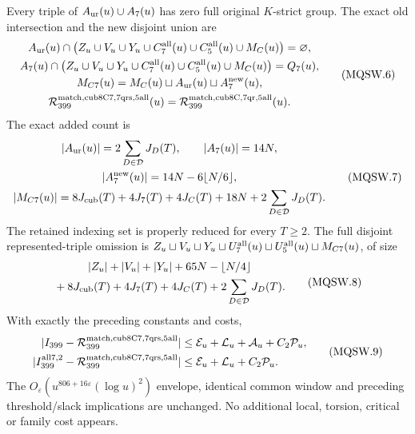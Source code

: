 \begin{theorem}
\label{AC-G218-window}
Every triple of
$A_{\rm ur}(u)\cup A_7(u)$ has zero full original $K$-strict group.
The exact old intersection and the new disjoint union are
\[
 \begin{gathered}
 A_{\rm ur}(u)\cap\bigl(Z_u\cup V_u\cup Y_u\cup C_7^{\rm all}(u)
                \cup C_5^{\rm all}(u)\cup M_C(u)\bigr)=\varnothing,\\
 A_7(u)\cap\bigl(Z_u\cup V_u\cup Y_u\cup C_7^{\rm all}(u)
                \cup C_5^{\rm all}(u)\cup M_C(u)\bigr)=Q_7(u),\\
 M_{C7}(u)=M_C(u)\sqcup A_{\rm ur}(u)\sqcup A_7^{\rm new}(u),\\
 \mathcal R_{399}^{\rm match,cub8C7,7qrs,5all}(u)
                      =\mathcal R_{399}^{\rm match,cub8C,7qr,5all}(u).
 \end{gathered}\tag{MQSW.6}
\]
The exact added count is
\[
 \begin{gathered}
 |A_{\rm ur}(u)|=2\sum_{D\in\mathcal D}J_D(T),\qquad
 |A_7(u)|=14N,\\
 |A_7^{\rm new}(u)|=14N-6\lfloor N/6\rfloor,\\
 |M_{C7}(u)|=8J_{\rm cub}(T)+4J_7(T)+4J_C(T)
                            +18N+2\sum_{D\in\mathcal D}J_D(T).
 \end{gathered}\tag{MQSW.7}
\]
The retained indexing set is properly reduced for every $T\geq2$.
The full disjoint represented-triple omission is
$Z_u\sqcup V_u\sqcup Y_u\sqcup U_7^{\rm all}(u)
 \sqcup U_5^{\rm all}(u)\sqcup M_{C7}(u)$, of size
\[
 \begin{gathered}
 |Z_u|+|V_u|+|Y_u|+65N-\lfloor N/4\rfloor\\
       {}+8J_{\rm cub}(T)+4J_7(T)+4J_C(T)
                              +2\sum_{D\in\mathcal D}J_D(T).
 \end{gathered}
 \tag{MQSW.8}
\]
With exactly the preceding constants and costs,
\[
 \begin{aligned}
 |I_{399}-\mathcal R_{399}^{\rm match,cub8C7,7qrs,5all}|&\leq
        \mathcal E_u+\mathcal L_u+\mathcal A_u+C_2\mathcal P_u,\\
 |I_{399}^{\rm all7,2}-\mathcal R_{399}^{\rm match,cub8C7,7qrs,5all}|&\leq
        \mathcal E_u+\mathcal L_u+C_2\mathcal P_u.
 \end{aligned}\tag{MQSW.9}
\]
The $O_\varepsilon(u^{806+16\varepsilon}(\log u)^2)$ envelope,
identical common window and preceding threshold/slack implications
are unchanged. No additional local, torsion, critical or family cost appears.
\end{theorem}

